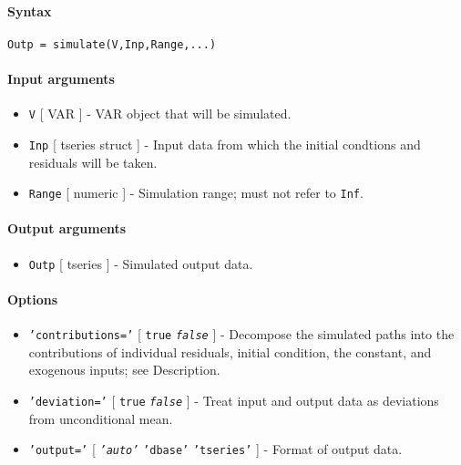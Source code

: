


	\paragraph{Syntax}\label{syntax}

\begin{verbatim}
Outp = simulate(V,Inp,Range,...)
\end{verbatim}

\paragraph{Input arguments}\label{input-arguments}

\begin{itemize}
\item
  \texttt{V} {[} VAR {]} - VAR object that will be simulated.
\item
  \texttt{Inp} {[} tseries \textbar{} struct {]} - Input data from which
  the initial condtions and residuals will be taken.
\item
  \texttt{Range} {[} numeric {]} - Simulation range; must not refer to
  \texttt{Inf}.
\end{itemize}

\paragraph{Output arguments}\label{output-arguments}

\begin{itemize}
\itemsep1pt\parskip0pt
\item
  \texttt{Outp} {[} tseries {]} - Simulated output data.
\end{itemize}

\paragraph{Options}\label{options}

\begin{itemize}
\item
  \texttt{'contributions='} {[} \texttt{true} \textbar{}
  \emph{\texttt{false}} {]} - Decompose the simulated paths into the
  contributions of individual residuals, initial condition, the
  constant, and exogenous inputs; see Description.
\item
  \texttt{'deviation='} {[} \texttt{true} \textbar{}
  \emph{\texttt{false}} {]} - Treat input and output data as deviations
  from unconditional mean.
\item
  \texttt{'output='} {[} \emph{\texttt{'auto'}} \textbar{}
  \texttt{'dbase'} \textbar{} \texttt{'tseries'} {]} - Format of output
  data.
\end{itemize}

